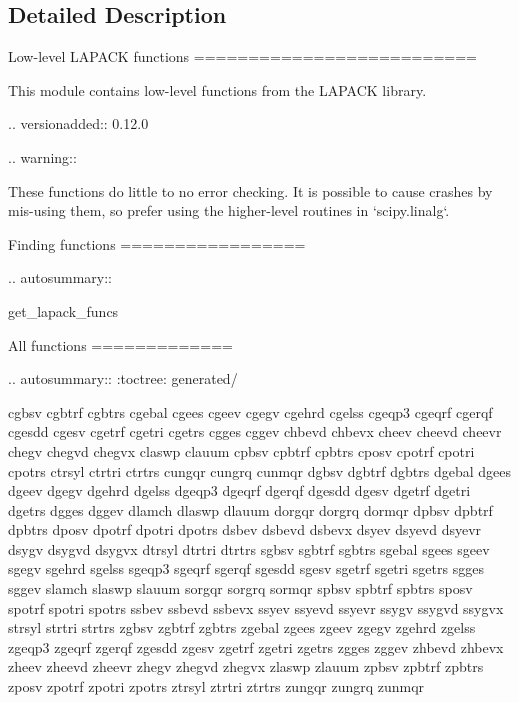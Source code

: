 \subsection{Detailed Description}
\begin{DoxyVerb}Low-level LAPACK functions
==========================

This module contains low-level functions from the LAPACK library.

.. versionadded:: 0.12.0

.. warning::

   These functions do little to no error checking.
   It is possible to cause crashes by mis-using them,
   so prefer using the higher-level routines in `scipy.linalg`.

Finding functions
=================

.. autosummary::

   get_lapack_funcs

All functions
=============

.. autosummary::
   :toctree: generated/

   cgbsv
   cgbtrf
   cgbtrs
   cgebal
   cgees
   cgeev
   cgegv
   cgehrd
   cgelss
   cgeqp3
   cgeqrf
   cgerqf
   cgesdd
   cgesv
   cgetrf
   cgetri
   cgetrs
   cgges
   cggev
   chbevd
   chbevx
   cheev
   cheevd
   cheevr
   chegv
   chegvd
   chegvx
   claswp
   clauum
   cpbsv
   cpbtrf
   cpbtrs
   cposv
   cpotrf
   cpotri
   cpotrs
   ctrsyl
   ctrtri
   ctrtrs
   cungqr
   cungrq
   cunmqr
   dgbsv
   dgbtrf
   dgbtrs
   dgebal
   dgees
   dgeev
   dgegv
   dgehrd
   dgelss
   dgeqp3
   dgeqrf
   dgerqf
   dgesdd
   dgesv
   dgetrf
   dgetri
   dgetrs
   dgges
   dggev
   dlamch
   dlaswp
   dlauum
   dorgqr
   dorgrq
   dormqr
   dpbsv
   dpbtrf
   dpbtrs
   dposv
   dpotrf
   dpotri
   dpotrs
   dsbev
   dsbevd
   dsbevx
   dsyev
   dsyevd
   dsyevr
   dsygv
   dsygvd
   dsygvx
   dtrsyl
   dtrtri
   dtrtrs
   sgbsv
   sgbtrf
   sgbtrs
   sgebal
   sgees
   sgeev
   sgegv
   sgehrd
   sgelss
   sgeqp3
   sgeqrf
   sgerqf
   sgesdd
   sgesv
   sgetrf
   sgetri
   sgetrs
   sgges
   sggev
   slamch
   slaswp
   slauum
   sorgqr
   sorgrq
   sormqr
   spbsv
   spbtrf
   spbtrs
   sposv
   spotrf
   spotri
   spotrs
   ssbev
   ssbevd
   ssbevx
   ssyev
   ssyevd
   ssyevr
   ssygv
   ssygvd
   ssygvx
   strsyl
   strtri
   strtrs
   zgbsv
   zgbtrf
   zgbtrs
   zgebal
   zgees
   zgeev
   zgegv
   zgehrd
   zgelss
   zgeqp3
   zgeqrf
   zgerqf
   zgesdd
   zgesv
   zgetrf
   zgetri
   zgetrs
   zgges
   zggev
   zhbevd
   zhbevx
   zheev
   zheevd
   zheevr
   zhegv
   zhegvd
   zhegvx
   zlaswp
   zlauum
   zpbsv
   zpbtrf
   zpbtrs
   zposv
   zpotrf
   zpotri
   zpotrs
   ztrsyl
   ztrtri
   ztrtrs
   zungqr
   zungrq
   zunmqr\end{DoxyVerb}
 

